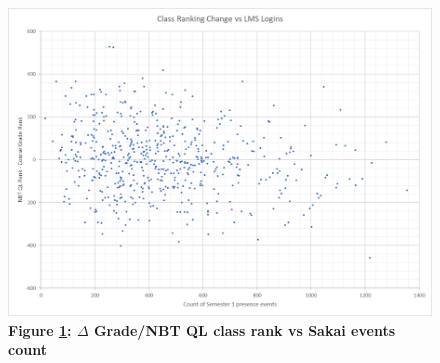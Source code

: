 \begin{figure}[H]
    \centering
    \includegraphics[scale=0.62]{./resources/figures/delta-class-rank.png}
    \caption[\( \Delta \) Grade/NBT QL class rank vs Sakai events count]{\textbf{Figure \ref{fig-delta-rank}: \( \Delta \) Grade/NBT QL class rank vs Sakai events count}}
    \label{fig-delta-rank}
\end{figure}